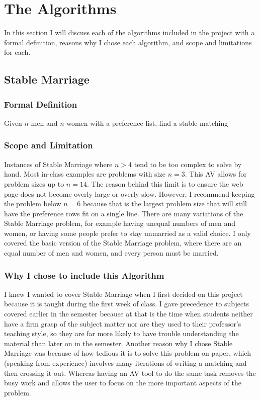 \chapter{The Algorithms} 
In this section I will discuss each of the algorithms included in the project 
with a formal definition, reasons why I chose each algorithm, and scope and limitations for each.
\section{Stable Marriage}
\subsection{Formal Definition}
Given $n$ men and $n$ women with a preference list, 
find a stable matching
\subsection{Scope and Limitation}
\hspace{-0.26in}
Instances of Stable Marriage where $n > 4$ tend to be too complex to solve by hand. 
Most in-class examples are problems with size $n = 3$.
This AV allows for problem sizes up to $n = 14$.
The reason behind this limit is to ensure the web page 
does not become overly large or overly slow. 
However, I recommend keeping the problem below $n = 6$ because that is 
the largest problem size that will still have the preference rows fit on a single line. 
\newline\newline
There are many variations of the Stable Marriage problem, for example 
having unequal numbers of men and women,
or having some people prefer to stay unmarried as a valid choice.
I only covered the basic version of the Stable Marriage problem, where 
there are an equal number of men and women, and every person must be married. 
\subsection{Why I chose to include this Algorithm}
\hspace{-0.26in}
I knew I wanted to cover Stable Marriage when I first decided on this project
because it is taught during the first week of class.
I gave precedence to subjects covered earlier in the semester 
because at that is the time when students neither have a firm grasp of the subject matter 
nor are they used to their professor's teaching style, 
so they are far more likely to have trouble understanding the material
than later on in the semester. 
\newline\newline
Another reason why I chose Stable Marriage was because of how tedious it is to 
solve this problem on paper, which (speaking from experience) involves many iterations of 
writing a matching and then crossing it out. 
Whereas having an AV tool to do the same task removes the busy work and allows 
the user to focus on the more important aspects of the problem.
%
